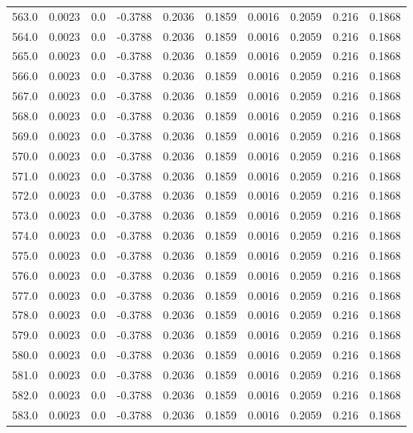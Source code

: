 \begin{longtable}{lrrrrrrrrr}
563.0 & 0.0023 & 0.0 & -0.3788 & 0.2036 & 0.1859 & 0.0016 & 0.2059 & 0.216 & 0.1868 \\
564.0 & 0.0023 & 0.0 & -0.3788 & 0.2036 & 0.1859 & 0.0016 & 0.2059 & 0.216 & 0.1868 \\
565.0 & 0.0023 & 0.0 & -0.3788 & 0.2036 & 0.1859 & 0.0016 & 0.2059 & 0.216 & 0.1868 \\
566.0 & 0.0023 & 0.0 & -0.3788 & 0.2036 & 0.1859 & 0.0016 & 0.2059 & 0.216 & 0.1868 \\
567.0 & 0.0023 & 0.0 & -0.3788 & 0.2036 & 0.1859 & 0.0016 & 0.2059 & 0.216 & 0.1868 \\
568.0 & 0.0023 & 0.0 & -0.3788 & 0.2036 & 0.1859 & 0.0016 & 0.2059 & 0.216 & 0.1868 \\
569.0 & 0.0023 & 0.0 & -0.3788 & 0.2036 & 0.1859 & 0.0016 & 0.2059 & 0.216 & 0.1868 \\
570.0 & 0.0023 & 0.0 & -0.3788 & 0.2036 & 0.1859 & 0.0016 & 0.2059 & 0.216 & 0.1868 \\
571.0 & 0.0023 & 0.0 & -0.3788 & 0.2036 & 0.1859 & 0.0016 & 0.2059 & 0.216 & 0.1868 \\
572.0 & 0.0023 & 0.0 & -0.3788 & 0.2036 & 0.1859 & 0.0016 & 0.2059 & 0.216 & 0.1868 \\
573.0 & 0.0023 & 0.0 & -0.3788 & 0.2036 & 0.1859 & 0.0016 & 0.2059 & 0.216 & 0.1868 \\
574.0 & 0.0023 & 0.0 & -0.3788 & 0.2036 & 0.1859 & 0.0016 & 0.2059 & 0.216 & 0.1868 \\
575.0 & 0.0023 & 0.0 & -0.3788 & 0.2036 & 0.1859 & 0.0016 & 0.2059 & 0.216 & 0.1868 \\
576.0 & 0.0023 & 0.0 & -0.3788 & 0.2036 & 0.1859 & 0.0016 & 0.2059 & 0.216 & 0.1868 \\
577.0 & 0.0023 & 0.0 & -0.3788 & 0.2036 & 0.1859 & 0.0016 & 0.2059 & 0.216 & 0.1868 \\
578.0 & 0.0023 & 0.0 & -0.3788 & 0.2036 & 0.1859 & 0.0016 & 0.2059 & 0.216 & 0.1868 \\
579.0 & 0.0023 & 0.0 & -0.3788 & 0.2036 & 0.1859 & 0.0016 & 0.2059 & 0.216 & 0.1868 \\
580.0 & 0.0023 & 0.0 & -0.3788 & 0.2036 & 0.1859 & 0.0016 & 0.2059 & 0.216 & 0.1868 \\
581.0 & 0.0023 & 0.0 & -0.3788 & 0.2036 & 0.1859 & 0.0016 & 0.2059 & 0.216 & 0.1868 \\
582.0 & 0.0023 & 0.0 & -0.3788 & 0.2036 & 0.1859 & 0.0016 & 0.2059 & 0.216 & 0.1868 \\
583.0 & 0.0023 & 0.0 & -0.3788 & 0.2036 & 0.1859 & 0.0016 & 0.2059 & 0.216 & 0.1868 \\

\end{longtable}
